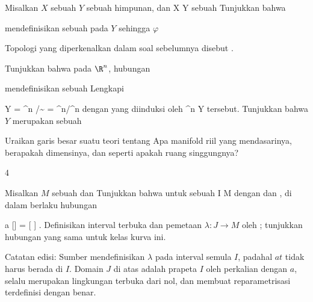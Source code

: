 {}
{

Misalkan $X$ sebuah
$Y$ sebuah himpunan, dan
\maabbdisp {\varphi} { X } { Y
} {}
sebuah
Tunjukkan bahwa

 {  }

mendefinisikan sebuah
pada $Y$ sehingga $\varphi$

}
{} {}

Topologi yang diperkenalkan dalam soal sebelumnya disebut  {.}

{}
{

Tunjukkan bahwa pada $\R^n$, hubungan

 {  }

mendefinisikan sebuah
Lengkapi

\mavergleichskettedisp
{\vergleichskette
{Y
}
{ =} {\R^n /\!\!\sim
}
{ =} {\R^n/\Z^n
}
{ } {
}
{ } {
}
}
{}{}{}
dengan
yang diinduksi oleh
\maabb {\varphi} {\R^n } { Y
} {}
tersebut. Tunjukkan bahwa $Y$ merupakan sebuah

}
{} {}

{}
{

Uraikan garis besar suatu teori tentang  Apa manifold riil yang mendasarinya, berapakah
 {} {}
dimensinya, dan seperti apakah ruang singgungnya?

}
{} {}


{4}
{

Misalkan $M$ sebuah
 dan
 Tunjukkan bahwa untuk sebuah
\maabbdisp {\gamma} { I } { M
} {}
dengan
 dan
, di dalam
 berlaku hubungan

\mavergleichskettedisp
{\vergleichskette
{a [\gamma]
}
{ =} { [  \lambda]
}
{ } {
}
{ } {
}
{ } {
}
}
{}{}{}. Definisikan interval terbuka
dan pemetaan $\lambda:J\to M$ oleh
; tunjukkan hubungan yang sama untuk kelas kurva ini.

Catatan edisi: Sumber mendefinisikan $\lambda$ pada interval semula $I$, padahal $at$ tidak harus berada di $I$. Domain $J$ di atas adalah prapeta $I$ oleh perkalian dengan $a$, selalu merupakan lingkungan terbuka dari nol, dan membuat reparametrisasi terdefinisi dengan benar.

}
{} {}

